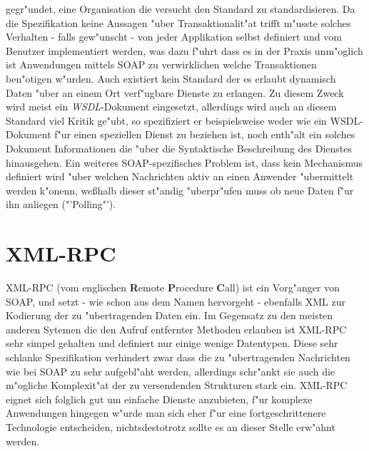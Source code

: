 gegr"undet, eine Organisation die versucht den Standard zu standardisieren.
Da die Spezifikation keine Aussagen "uber Transaktionalit"at trifft m"usste solches Verhalten - falls gew"unscht - von jeder Applikation selbst
definiert und vom Benutzer implementiert werden, was dazu f"uhrt dass es in der Praxis unm"oglich ist Anwendungen mittels SOAP zu
verwirklichen welche Transaktionen ben"otigen w"urden. Auch existiert kein Standard der es erlaubt dynamisch Daten "uber an einem Ort verf"ugbare
Dienste zu erlangen. Zu diesem Zweck wird meist ein \emph{WSDL}-Dokument \cite{WSDLSPEC} eingesetzt, allerdings wird auch an diesem
Standard viel Kritik ge"ubt, so spezifiziert er beispielsweise weder wie ein WSDL-Dokument f"ur einen speziellen Dienst zu beziehen ist,
noch enth"alt ein solches Dokument Informationen die "uber die Syntaktische Beschreibung des Dienstes hinausgehen.
Ein weiteres SOAP-spezifisches Problem ist,
dass kein Mechanismus definiert wird "uber welchen Nachrichten aktiv an einen Anwender "ubermittelt werden k"onenn, we\ss halb dieser
st"andig "uberpr"ufen muss ob neue Daten f"ur ihn anliegen ("'Polling"').

\section{XML-RPC}
\label{sec:background:xmlrpc}
XML-RPC (vom englischen \textbf{R}emote \textbf{P}rocedure \textbf{C}all) ist ein Vorg"anger von SOAP, und setzt - wie schon
aus dem Namen hervorgeht - ebenfalls XML zur Kodierung der zu "ubertragenden Daten ein. Im Gegensatz zu den meisten anderen
Sytemen die den Aufruf entfernter Methoden erlauben ist XML-RPC sehr simpel gehalten und definiert nur einige wenige
Datentypen. Diese sehr schlanke Spezifikation verhindert zwar dass die zu "ubertragenden Nachrichten wie bei SOAP zu sehr 
aufgebl"aht werden, allerdings schr"ankt sie auch die m"ogliche Komplexit"at der zu versendenden Strukturen stark ein.
XML-RPC eignet sich folglich gut um einfache Dienste anzubieten, f"ur komplexe Anwendungen hingegen w"urde man sich eher 
f"ur eine fortgeschrittenere Technologie entscheiden, nichtsdestotrotz sollte es an dieser Stelle erw"ahnt werden.

